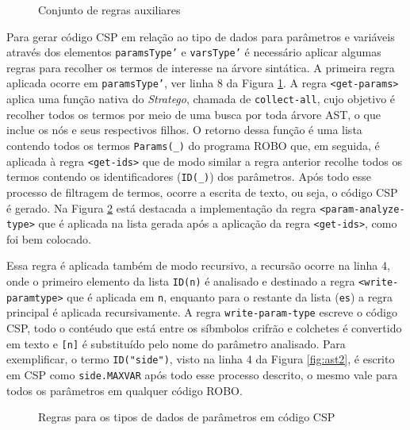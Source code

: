 \begin{figure}[h]
\centering
\caption{Conjunto de regras auxiliares}

\label{fig:rules2}
\end{figure}

Para gerar código CSP em relação ao tipo de dados para parâmetros e variáveis através dos elementos \texttt{paramsType'} e \texttt{varsType'} é necessário aplicar algumas regras para recolher os termos de interesse na árvore sintática. A primeira regra aplicada ocorre em \texttt{paramsType'}, ver linha 8 da Figura \ref{fig:rules2}. A regra \texttt{<get-params>} aplica uma função nativa do \textit{Stratego}, chamada de \texttt{collect-all}, cujo objetivo é recolher todos os termos por meio de uma busca por toda árvore AST, o que inclue os nós e seus respectivos filhos. O retorno dessa função é uma lista contendo todos os termos \texttt{Params(\_)} do programa ROBO que, em seguida,  é aplicada à regra \texttt{<get-ids>} que de modo similar a regra anterior recolhe todos os termos contendo os identificadores (\texttt{ID(\_)}) dos parâmetros. Após todo esse processo de filtragem de termos, ocorre a escrita de texto, ou seja, o código CSP é gerado. Na Figura \ref{fig:rules_param_type} está destacada a implementação da regra \texttt{<param-analyze-type>} que é aplicada na lista gerada após a aplicação da regra \texttt{<get-ids>}, como foi bem colocado.

Essa regra é aplicada também de modo recursivo, a recursão ocorre na linha 4, onde o primeiro elemento da lista \texttt{ID(n)} é analisado e destinado a regra \texttt{<write-param\-type>} que é aplicada em \texttt{n}, enquanto para o restante da lista (\texttt{es}) a regra principal é aplicada recursivamente. A regra \texttt{write-param-type} escreve o código CSP, todo o contéudo que está entre os síbmbolos crifrão e colchetes é convertido em texto e \texttt{[n]} é substituído pelo nome do parâmetro analisado. Para exemplificar, o termo \texttt{ID("side")}, visto na linha 4 da Figura \ref{fig:ast2}, é escrito em CSP como \texttt{side.MAXVAR} após todo esse processo descrito, o mesmo vale para todos os parâmetros em qualquer código ROBO.

\begin{figure}[h]
\centering
\caption{Regras para os tipos de dados de parâmetros em código CSP}

\label{fig:rules_param_type}
\end{figure}

